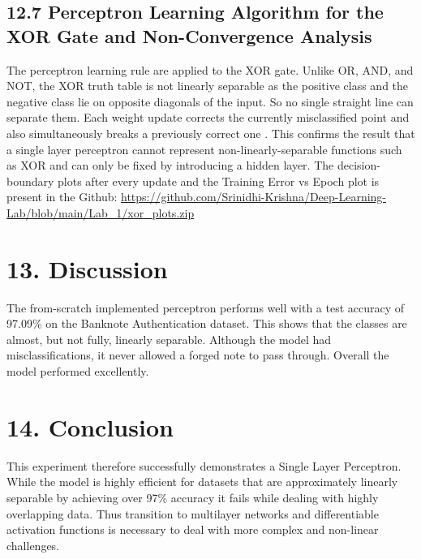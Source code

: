 \documentclass[11pt]{article}
\begin{document}
\vspace{3mm}
\subsection*{12.7 Perceptron Learning Algorithm for the XOR Gate and Non-Convergence Analysis}
The perceptron learning rule are applied to the XOR gate. Unlike OR, AND, and NOT, the XOR truth table is not linearly separable as the positive class and the negative class lie on opposite diagonals of the input. So no single straight line can separate them. Each weight update corrects the currently misclassified point and also simultaneously breaks a previously correct one . This confirms the result that a single layer perceptron cannot represent non-linearly-separable functions such as XOR and can only be fixed by introducing a hidden layer. The decision-boundary plots after every update and the Training Error vs Epoch plot is present in the Github:
\url{https://github.com/Srinidhi-Krishna/Deep-Learning-Lab/blob/main/Lab_1/xor_plots.zip}


\section*{13. Discussion}

The from-scratch implemented perceptron performs well with a test accuracy of  97.09\% on the Banknote Authentication dataset. This shows that the classes are almost, but not fully, linearly separable. Although the model had misclassifications, it never allowed a forged note to pass through. Overall the model performed excellently.


\section*{14. Conclusion}

This experiment therefore successfully demonstrates a Single Layer Perceptron. While the model is highly efficient for datasets that are approximately linearly separable by achieving over 97\% accuracy it fails while dealing with highly overlapping data. Thus transition to multilayer networks and differentiable activation functions is necessary to deal with more complex and non-linear challenges.

\end{document}
